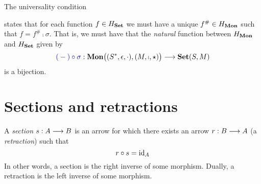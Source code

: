 \begin{remark}
    The universality condition 
    \begin{center}
    \end{center}
    states that for each function $f \in H_{\mathbf {Set}}$
    we must have a unique $f^\# \in H_{\mathbf {Mon}}$ such that $f = f^\# \comp
    \sigma$.  That is, we must have that the \emph{natural} function
    between $H_{\mathbf {Mon}}$ and $H_{\mathbf {Set}}$ given by
    \begin{equation*}
      \textcolor{blue}{(}-\textcolor{blue}{)\circ\sigma}:
      \mathbf {Mon} \big( (S^*, \epsilon, \cdot), (M, \shortmid, \star) \big) 
      \longrightarrow
      \mathbf {Set} ( S, M )
    \end{equation*}
    is a bijection.
\end{remark}

\section{Sections and retractions}

\begin{definition}
A \emph{section} $s : A \longrightarrow B$ is an arrow for which there exists an
arrow $r : B \longrightarrow A$ (a \emph{retraction}) such that
\[
    r \circ s = \mathrm{id}_{ A }
\]
In other words, a section is the right inverse of some morphism.
Dually, a retraction is the left inverse of some morphism.
\end{definition}

